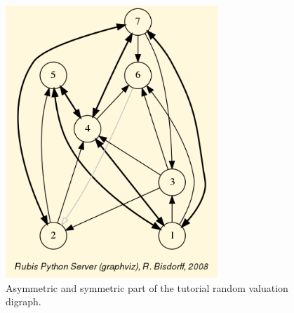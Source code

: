 \begin{figure}[h]
\includegraphics[width=8cm]{Figures/tutRandValDigraph.png}
\caption{Asymmetric and symmetric part of the tutorial random valuation digraph.}
\label{fig:2.2}       %
\end{figure}
  
